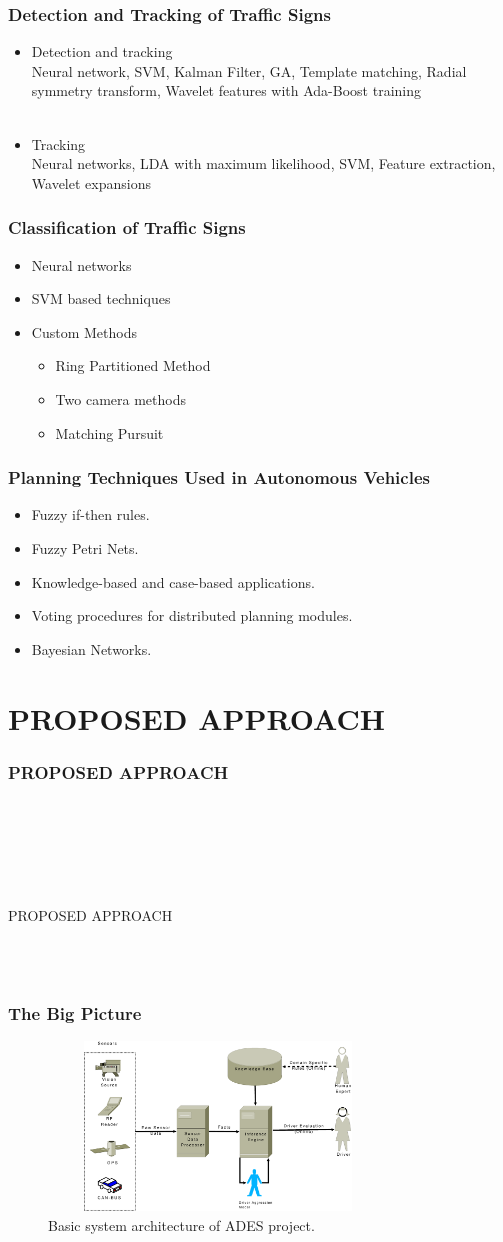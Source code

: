 \documentclass{beamer}
\newcommand{\mysectionpage}[2]{
	\begin{frame}
		\frametitle{#1}
		~\\~
		\begin{block}{}
			~\\~
			\begin{center}
				#2
			\end{center}
			~\\~
		\end{block}
	\end{frame}
}
\begin{document}
\frame
{
  \frametitle{Detection and Tracking of Traffic Signs}
  \begin{itemize}
	  \item Detection and tracking\\ 	
				Neural network, SVM, Kalman Filter, GA, Template matching, Radial symmetry transform, Wavelet features with Ada-Boost training\\ ~
	  \item Tracking \\
				Neural networks, LDA with maximum likelihood, SVM, Feature extraction, Wavelet expansions
  \end{itemize}
}

\frame
{
	\frametitle{Classification of Traffic Signs}
	\begin{itemize}
		\item Neural networks
		\item SVM based techniques 
		\item Custom Methods
		\begin{itemize}
			\item Ring Partitioned Method 
			\item Two camera methods
			\item Matching Pursuit
		\end{itemize}
	\end{itemize}
}

\frame
{
  \frametitle{Planning Techniques Used in Autonomous Vehicles}
  \begin{itemize}
  	\item Fuzzy if-then rules.
  	\item Fuzzy Petri Nets.
  	\item Knowledge-based and case-based applications.
  	\item Voting procedures for distributed planning modules.
  	\item Bayesian Networks.
  \end{itemize}
}


\section{PROPOSED APPROACH}
\mysectionpage{PROPOSED APPROACH}{PROPOSED APPROACH}

\frame
{
  \frametitle{The Big Picture}
  \begin{figure}[ht]
  \begin{center}
  \includegraphics[width=90mm,height=45mm]{../img/sys3.eps}
  \caption{Basic system architecture of ADES project.}
  \label{fig:sys}
  \end{center}
  \end{figure}
}
\end{document}
